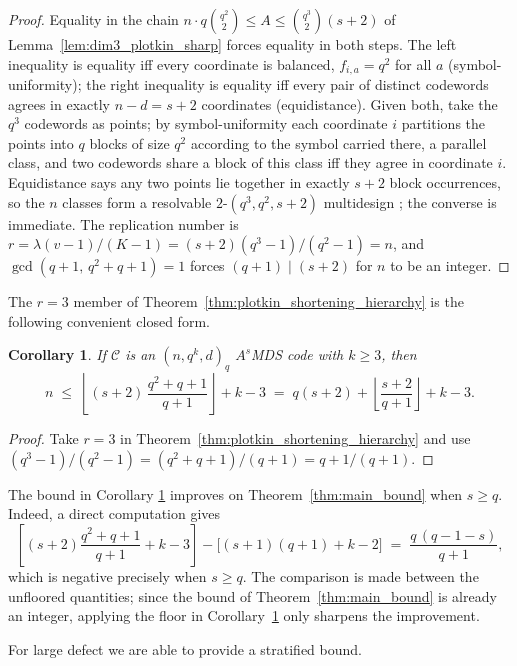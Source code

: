 \documentclass[12pt, letterpaper]{article}
\theoremstyle{plain}
\newtheorem{corollary}[theorem]{Corollary}
\theoremstyle{definition}
\newcommand{\mc}[1]{\mathcal{#1}}
\begin{document}
	\begin{proof}
		Equality in the chain $n\cdot q\binom{q^2}{2}\le A\le\binom{q^3}{2}(s+2)$ of Lemma~\ref{lem:dim3_plotkin_sharp} forces equality in both steps. The left inequality is equality iff every coordinate is balanced, $f_{i,a}=q^2$ for all $a$ (symbol-uniformity); the right inequality is equality iff every pair of distinct codewords agrees in exactly $n-d=s+2$ coordinates (equidistance). Given both, take the $q^3$ codewords as points; by symbol-uniformity each coordinate $i$ partitions the points into $q$ blocks of size $q^2$ according to the symbol carried there, a parallel class, and two codewords share a block of this class iff they agree in coordinate $i$. Equidistance says any two points lie together in exactly $s+2$ block occurrences, so the $n$ classes form a resolvable $2$-$(q^3,q^2,s+2)$ multidesign \cite{BethJungnickelLenz1999}; the converse is immediate. The replication number is $r = \lambda(v-1)/(K-1) = (s+2)(q^3-1)/(q^2-1) = n$, and $\gcd(q+1,\,q^2+q+1)=1$ forces $(q+1)\mid(s+2)$ for $n$ to be an integer.
	\end{proof}
	
	The $r=3$ member of Theorem~\ref{thm:plotkin_shortening_hierarchy} is the following convenient closed form.

	\begin{corollary}\label{cor:dim3_plotkin_floor}
		If $\mc{C}$ is an $(n, q^k, d)_q$ $A^s$MDS code with $k \ge 3$, then
		\[
		n \;\le\; \left\lfloor (s+2)\,\frac{q^2+q+1}{q+1}\right\rfloor + k - 3
		\;=\; q(s+2) + \left\lfloor\frac{s+2}{q+1}\right\rfloor + k - 3.
		\]
	\end{corollary}

	\begin{proof}
		Take $r=3$ in Theorem~\ref{thm:plotkin_shortening_hierarchy} and use
		$(q^3-1)/(q^2-1)=(q^2+q+1)/(q+1)=q+1/(q+1)$.
	\end{proof}

		The bound in Corollary \ref{cor:dim3_plotkin_floor} improves on Theorem~\ref{thm:main_bound} when $s \ge q$. Indeed, a direct computation gives
\[
\left[(s+2)\frac{q^2+q+1}{q+1} + k - 3\right] - \bigl[(s+1)(q+1)+k-2\bigr]
\;=\; \frac{q\,(q-1-s)}{q+1},
\]
which is negative precisely when $s \ge q$. The comparison is made between the unfloored quantities; since the bound of Theorem~\ref{thm:main_bound} is already an integer, applying the floor in Corollary~\ref{cor:dim3_plotkin_floor} only sharpens the improvement.

For large defect we are able to provide a stratified bound.
\end{document}
